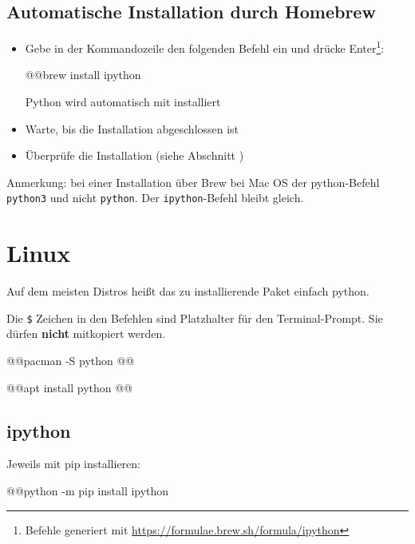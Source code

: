 \subsection*{Automatische Installation durch Homebrew}
\begin{itemize}
    \item Gebe in der Kommandozeile den folgenden Befehl ein und drücke Enter\footnote{Befehle generiert mit \url{https://formulae.brew.sh/formula/ipython}}:
\begin{commandshell}
@\shellprefix{}@brew install ipython
\end{commandshell}
        Python wird automatisch mit installiert
    \item Warte, bis die Installation abgeschlossen ist
    \item Überprüfe die Installation (siehe Abschnitt )
\end{itemize}

Anmerkung: bei einer Installation über Brew bei Mac OS der python-Befehl \texttt{python3} und nicht \texttt{python}. Der \texttt{ipython}-Befehl bleibt gleich.

\newpage
\section*{Linux}
Auf dem meisten Distros heißt das zu installierende Paket einfach {\ttfamily python}.
\begin{hinweis}
    Die \verb+$+ Zeichen in den Befehlen sind Platzhalter für den Terminal-Prompt. Sie dürfen \textbf{nicht} mitkopiert werden.
\end{hinweis}
\begin{commandshell}[][minted language=text]
    @\shellprefix{}@pacman -S python @@
\end{commandshell}

\begin{commandshell}[][minted language=text]
    @\shellprefix{}@apt install python @@
\end{commandshell}

\subsection*{ipython}
Jeweils mit pip installieren:
\begin{commandshell}[][minted language=text]
    @\shellprefix{}@python -m pip install ipython
\end{commandshell}

